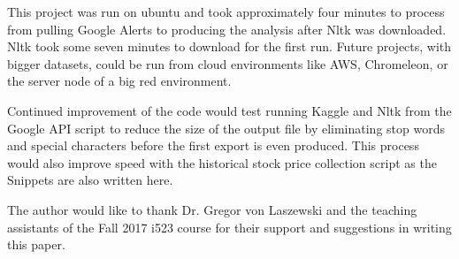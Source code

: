 \documentclass[sigconf]{acmart}
\begin{document}
This project was run on ubuntu and took approximately four minutes to process from pulling Google Alerts to producing the analysis after Nltk was downloaded. Nltk took some seven minutes to download for the first run. Future projects, with bigger datasets, could be run from cloud environments like AWS, Chromeleon, or the server node of a big red environment. 

Continued improvement of the code would test running Kaggle and Nltk from the Google API script to reduce the size of the output file by eliminating stop words and special characters before the first export is even produced. This process would also improve speed with the historical stock price collection script as the Snippets are also written here.


\begin{acks}

The author would like to thank Dr. Gregor von Laszewski and the teaching assistants of the Fall 2017 i523 course for their support and suggestions in writing this paper. 

\end{acks}


 
\end{document}
